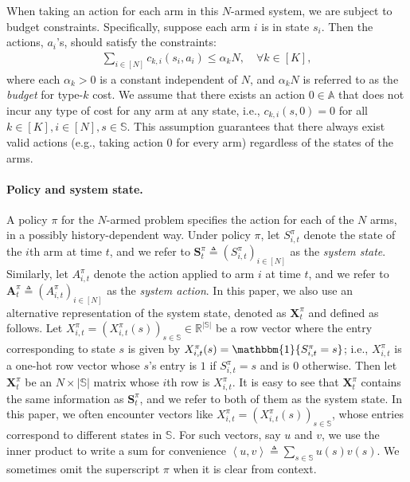 \documentclass{article}
\theoremstyle{plain}
\theoremstyle{remark}
\newcommand{\sspa}{\mathbb{S}}
\newcommand{\aspa}{\mathbb{A}}
\def\mX{{\bm{X}}}
\newcommand{\innerproduct}[2]{\left\langle #1, #2 \right\rangle}
\begin{document}
When taking an action for each arm in this $N$-armed system, we are subject to budget constraints.
Specifically, suppose each arm $i$ is in state $s_i$.
Then the actions, $a_i$'s, should satisfy the constraints:
\begin{align}\label{eq:cost}
    \sum_{i\in[N]} c_{k,i}(s_i, a_i)\le \alpha_k N,\quad \forall k\in[K],
\end{align}
where each $\alpha_k>0$ is a constant independent of $N$, and $\alpha_k N$ is referred to as the \emph{budget} for type-$k$ cost.
We assume that there exists an action $0\in\aspa$ that does not incur any type of cost for any arm at any state, i.e., $c_{k,i}(s,0)=0$ for all $k\in[K],i\in[N],s\in\sspa$.
This assumption guarantees that there always exist valid actions (e.g., taking action $0$ for every arm) regardless of the states of the arms.


\paragraph{Policy and system state.}
A policy $\pi$ for the $N$-armed problem specifies the action for each of the $N$ arms, in a possibly history-dependent way.
Under policy $\pi$, let $S_{i,t}^\pi$ denote the state of the $i$th arm at time $t$, and we refer to $\bm{S}^\pi_t \triangleq (S_{i,t}^\pi)_{i\in[N]}$ as the \emph{system state}. Similarly,
let $A_{i,t}^\pi$ denote the action applied to arm $i$ at time $t$, and we refer to $\bm{A}^\pi_t \triangleq (A_{i,t}^\pi)_{i\in[N]}$ as the \emph{system action}. 
In this paper, we also use an alternative representation of the system state, denoted as $\mX_t^\pi$ and defined as follows.
Let $X_{i,t}^\pi=(X_{i,t}^\pi(s))_{s\in\sspa}\in\mathbb{R}^{|\sspa|}$ be a row vector where the entry corresponding to state $s$ is given by $X_{i,t}^{\pi}(s)=\mathbbm{1}\{S_{i,t}^\pi=s\}$; i.e., $X_{i,t}^\pi$ is a one-hot row vector whose $s$'s entry is $1$ if $S_{i,t}^\pi=s$ and is $0$ otherwise.
Then let $\mX_t^\pi$ be an $N\times|\sspa|$ matrix whose $i$th row is $X_{i,t}^\pi$.
It is easy to see that $\mX_t^\pi$ contains the same information as $\bm{S}^\pi_t$, and we refer to both of them as the system state.
In this paper, we often encounter vectors like $X_{i,t}^\pi=(X_{i,t}^\pi(s))_{s\in\sspa}$, whose entries correspond to different states in $\sspa$.
For such vectors, say $u$ and $v$, we use the inner product to write a sum for convenience $\innerproduct{u}{v}\triangleq \sum_{s\in\sspa}u(s)v(s)$.
We sometimes omit the superscript $\pi$ when it is clear from context.
\end{document}
